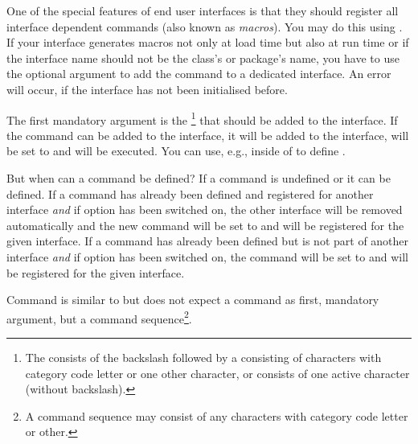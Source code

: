 \begin{Declaration}
\end{Declaration}
One of the special features of end user interfaces is that they should
register all interface dependent commands (also known as \emph{macros}). You
may do this using %
. If your interface generates macros not only at load time but also at run
time or if the interface name should not be the class's or package's name, you
have to use the optional argument to add the command to a dedicated
interface. An error will occur, if the interface has not been initialised
before.

The first mandatory argument is the \footnote{The
   consists of the backslash followed by a  consisting of characters with category code letter or one other
  character, or  consists of one active character (without
  backslash).} that should be added to the interface. If the command can be
added to the interface, it will be added to the interface, will be set to
 and  will be executed. You can use, e.g.,
 inside of  to define
.

But when can a command be defined? If a command is undefined or 
it can be defined. If a command has already been defined and registered for
another interface \emph{and} if \KOMAScript{} option
 has been switched on, the other interface will be
removed automatically and the new command will be set to  and
will be registered for the given interface. If a command
has already been defined but is not part of another interface \emph{and} if
\KOMAScript{} option  has been switched on, the command
will be set to  and will be registered for the given interface.

Command  is similar to
 but does not expect a command as first,
mandatory argument, but a command sequence\footnote{A command sequence may
  consist of any characters with category code letter or other.}.%
\EndIndexGroup


